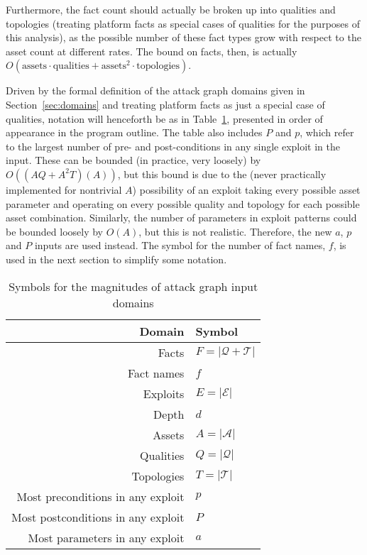 Furthermore, the fact count should actually be broken up into qualities and
topologies (treating platform facts as special cases of qualities for the
purposes of this analysis), as the possible number of these fact types grow 
with respect to the asset count at different rates. The bound on facts, then,
is actually $O(\text{assets} \cdot \text{qualities} + 
\text{assets}^2 \cdot \text{topologies})$.

Driven by the formal definition of the attack graph domains given in 
Section~\ref{sec:domains} and treating platform facts as just a special case
of qualities, notation will henceforth be as in Table~\ref{table:onotation},
presented in order of appearance in the program outline. The table also
includes $P$ and $p$, which refer to the largest number of pre- and 
post-conditions in any single exploit in the input. These can be bounded (in
practice, very loosely) by $O((AQ + A^2T)(A))$, but this bound is due to the
(never practically implemented for nontrivial $A$) possibility of an exploit
taking every possible asset parameter and operating on every possible quality
and topology for each possible asset combination. Similarly, the number of
parameters in exploit patterns could be bounded loosely by $O(A)$, but this is
not realistic. Therefore, the new $a$, $p$ and $P$ inputs are used instead.
The symbol for the number of fact names, $f$, is used in the next
section to simplify some notation.

\begin{table}
\centering %
\begin{tabular}{r|l}
Domain & Symbol \\ \hline
Facts       & $F = |\mathcal{Q}+\mathcal{T}|$ \\
Fact names  & $f$ \\
Exploits    & $E = |\mathcal{E}|$ \\
Depth       & $d$ \\
Assets      & $A = |\mathcal{A}|$ \\
Qualities   & $Q = |\mathcal{Q}|$ \\
Topologies  & $T = |\mathcal{T}|$ \\
Most preconditions in any exploit & $p$ \\
Most postconditions in any exploit & $P$ \\
Most parameters in any exploit & $a$
\end{tabular}
\caption{Symbols for the magnitudes of attack graph input domains}
\label{table:onotation}
\end{table}

